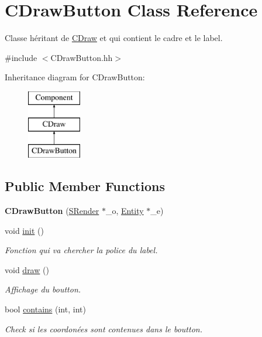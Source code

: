 \hypertarget{class_c_draw_button}{}\section{C\+Draw\+Button Class Reference}
\label{class_c_draw_button}


Classe héritant de \hyperlink{class_c_draw}{C\+Draw} et qui contient le cadre et le label.  




{\ttfamily \#include $<$C\+Draw\+Button.\+hh$>$}

Inheritance diagram for C\+Draw\+Button\+:\begin{figure}[H]
\begin{center}
\leavevmode
\includegraphics[height=3.000000cm]{class_c_draw_button}
\end{center}
\end{figure}
\subsection*{Public Member Functions}
\begin{DoxyCompactItemize}
\item 
\hypertarget{class_c_draw_button_a02b576eb0c72c556df544876fd6a9677}{}{\bfseries C\+Draw\+Button} (\hyperlink{class_s_render}{S\+Render} $\ast$\+\_\+o, \hyperlink{class_entity}{Entity} $\ast$\+\_\+e)\label{class_c_draw_button_a02b576eb0c72c556df544876fd6a9677}

\item 
\hypertarget{class_c_draw_button_a8499d64ef9d8f8d6478c86352f3be94c}{}void \hyperlink{class_c_draw_button_a8499d64ef9d8f8d6478c86352f3be94c}{init} ()\label{class_c_draw_button_a8499d64ef9d8f8d6478c86352f3be94c}

\begin{DoxyCompactList}\small\item\em Fonction qui va chercher la police du label. \end{DoxyCompactList}\item 
\hypertarget{class_c_draw_button_ab12035c1612138ca17ec3fc3da535247}{}void \hyperlink{class_c_draw_button_ab12035c1612138ca17ec3fc3da535247}{draw} ()\label{class_c_draw_button_ab12035c1612138ca17ec3fc3da535247}

\begin{DoxyCompactList}\small\item\em Affichage du boutton. \end{DoxyCompactList}\item 
bool \hyperlink{class_c_draw_button_a8e8caf8b79a83d0ba38ab0e604a341dc}{contains} (int, int)
\begin{DoxyCompactList}\small\item\em Check si les coordonées sont contenues dans le boutton. \end{DoxyCompactList}\end{DoxyCompactItemize}
